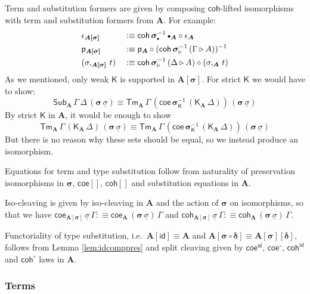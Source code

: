 \documentclass[12pt,a4paper,twoside,openany]{book}
\theoremstyle{remark}
\theoremstyle{definition}
\theoremstyle{theorem}
\newcommand{\bs}[1]{\boldsymbol{#1}}
\newcommand{\id}{\mathsf{id}}
\newcommand{\Sub}{\mathsf{Sub}}
\newcommand{\Tm}{\mathsf{Tm}}
\newcommand{\ext}{\triangleright}
\newcommand{\emptycon}{\scaleobj{.75}\bullet}
\newcommand{\appK}{\mathsf{app}_{\K}}
\newcommand{\p}{\mathsf{p}}
\newcommand{\K}{\mathsf{K}}
\newcommand{\bsigma}{\bs{\sigma}}
\newcommand{\bA}{\bs{A}}
\newcommand{\ul}[1]{\underline{#1}}
\newcommand{\ulsigma}{\ul{\sigma}}
\newcommand{\coe}{\mathsf{coe}}
\newcommand{\coh}{\mathsf{coh}}
\newcommand{\defn}{:\equiv}
\begin{document}
Term and substitution formers are given by composing $\coh$-lifted
isomorphisms with term and substitution formers from $\bA$. For example:
\begin{alignat*}{3}
  & \epsilon_{\bs{A[\sigma]}} && \defn
    \coh\,\bsigma_{\emptycon}^{-1}\,\emptycon_{\bA} \circ \epsilon_{\bA}\\
  & \p_{\bs{A[\sigma]}} && \defn
    \p_{\bA} \circ (\coh\,\bsigma_{\ext}^{-1}\,(\Gamma\ext A))^{-1}\\
  & (\sigma,_{\bs{A[\sigma]}}\,t) && \defn \coh\,\bsigma_{\ext}^{-1}\,(\Delta\ext A) \circ (\sigma,_{\bA}\,t)
\end{alignat*}
As we mentioned, only weak $\K$ is supported in $\bs{A[\sigma]}$. For strict $\K$
we would have to show:
\[
\Sub_{\bA}\,\Gamma\,\Delta\,(\bsigma\,\ulsigma)
\equiv \Tm_{\bA}\,\Gamma\,(\coe\,\bsigma_{\K}^{-1}\,(\K_{\bA}\,\Delta))\,(\bsigma\,\ulsigma)
\]
By strict $\K$ in $\bA$, it would be enough to show
\[
\Tm_{\bA}\,\Gamma\,(\K_{\bA}\,\Delta)\,(\bsigma\,\ulsigma)
\equiv \Tm_{\bA}\,\Gamma\,(\coe\,\bsigma_{\K}^{-1}\,(\K_{\bA}\,\Delta))\,(\bsigma\,\ulsigma)
\]
But there is no reason why these sets should be equal, so we instead produce an isomorphism.

Equations for term and type substitution follow from naturality of preservation
isomorphisms in $\bsigma$, $\coe[]$, $\coh[]$ and substitution equations in
$\bA$.


Iso-cleaving is given by iso-cleaving in $\bA$ and the action of $\bsigma$ on
isomorphisms, so that we have $\coe_{\bs{A[\sigma]}}\,\ulsigma\,\Gamma
\defn \coe_{\bA}\,(\bsigma\,\ulsigma)\,\Gamma$ and $\coh_{\bs{A[\sigma]}}\,\ulsigma\,\Gamma
\defn \coh_{\bA}\,(\bsigma\,\ulsigma)\,\Gamma$.

Functoriality of type substitution, i.e.\ $\bs{A[\id]} \equiv \bA$ and
$\bs{A[\sigma\circ\delta]} \equiv \bs{A[\sigma][\delta]}$, follows
from Lemma \ref{lem:idcomppres} and split cleaving given by $\coe^{\id}$,
$\coe^{\circ}$, $\coh^{\id}$ and $\coh^{\circ}$ laws in $\bA$.

\subsubsection{Terms}
\end{document}
